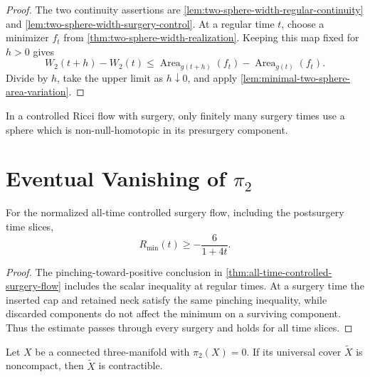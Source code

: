 \begin{proof}
The two continuity assertions are
\ref{lem:two-sphere-width-regular-continuity} and
\ref{lem:two-sphere-width-surgery-control}.  At a regular time $t$, choose a
minimizer $f_t$ from \ref{thm:two-sphere-width-realization}.  Keeping this
map fixed for $h>0$ gives
\[
 W_2(t+h)-W_2(t)
 \le\operatorname{Area}_{g(t+h)}(f_t)-\operatorname{Area}_{g(t)}(f_t).
\]
Divide by $h$, take the upper limit as $h\downarrow0$, and apply
\ref{lem:minimal-two-sphere-area-variation}.
\end{proof}

\begin{theorem}
\label{thm:finite-essential-sphere-surgeries}
\notready
In a controlled Ricci flow with surgery, only finitely many surgery times use
a sphere which is non-null-homotopic in its presurgery component.
\end{theorem}

\section{Eventual Vanishing of \texorpdfstring{$\pi_2$}{pi2}}

\begin{lemma}
\label{lem:extinction-scalar-curvature-lower-bound}
\notready
For the normalized all-time controlled surgery flow, including the
postsurgery time slices,
\[
 R_{\min}(t)\ge-\frac6{1+4t}.
\]
\end{lemma}

\begin{proof}
The pinching-toward-positive conclusion in
\ref{thm:all-time-controlled-surgery-flow} includes the scalar inequality at
regular times.  At a surgery time the inserted cap and retained neck satisfy
the same pinching inequality, while discarded components do not affect the
minimum on a surviving component.  Thus the estimate passes through every
surgery and holds for all time slices.
\end{proof}

\begin{theorem}
\label{thm:noncompact-two-connected-cover-contractible}
\notready
Let $X$ be a connected three-manifold with $\pi_2(X)=0$.  If its universal
cover $\widetilde X$ is noncompact, then $\widetilde X$ is contractible.
\end{theorem}

